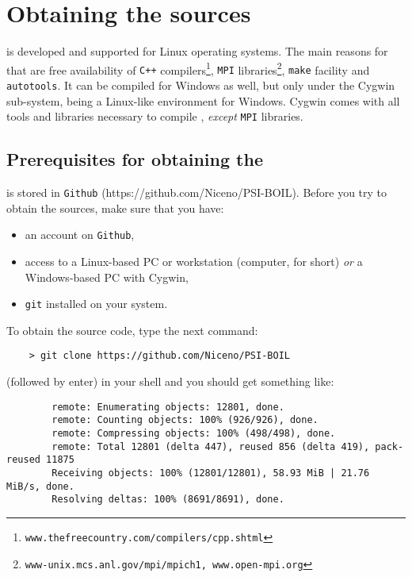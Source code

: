 \section{Obtaining the sources}
\label{sec_obtaining}

{\psiboil} is developed and supported for Linux operating systems.
The main reasons for that are free availability of {\tt C++} 
compilers\footnote{\tt www.thefreecountry.com/compilers/cpp.shtml},
{\tt MPI} libraries\footnote{\tt www-unix.mcs.anl.gov/mpi/mpich1, 
www.open-mpi.org}, 
{\tt make} facility and {\tt autotools}.
It can be compiled for Windows as well, but only under the Cygwin sub-system,
being a Linux-like environment for Windows. Cygwin comes with all tools and
libraries necessary to compile {\psiboil}, {\em except} {\tt MPI} libraries.

\subsection{Prerequisites for obtaining the {\psiboil}}

{\psiboil} is stored in {\tt Github}  (https://github.com/Niceno/PSI-BOIL). 
Before you try to obtain the sources, make sure that you have:

\begin{itemize}
  \item an account on {\tt Github},
  \item access to a Linux-based PC or workstation (computer,
        for short) {\em or} a Windows-based PC with Cygwin,
  \item {\tt git} installed on your system.
\end{itemize}

To obtain the source code, type the next command:
\begin{verbatim}
	> git clone https://github.com/Niceno/PSI-BOIL
\end{verbatim}
%
(followed by enter) in your shell and you should get something like:
%
{\small \begin{verbatim}
		remote: Enumerating objects: 12801, done.
		remote: Counting objects: 100% (926/926), done.
		remote: Compressing objects: 100% (498/498), done.
		remote: Total 12801 (delta 447), reused 856 (delta 419), pack-reused 11875
		Receiving objects: 100% (12801/12801), 58.93 MiB | 21.76 MiB/s, done.
		Resolving deltas: 100% (8691/8691), done.
\end{verbatim}}

